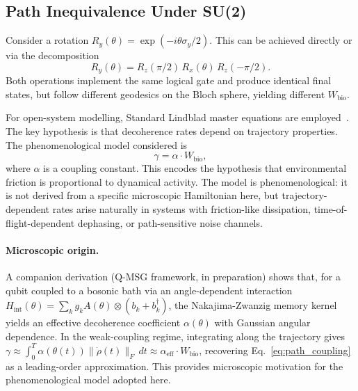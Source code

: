 \documentclass[12pt,a4paper]{article}
\begin{document}
\subsection{Path Inequivalence Under SU(2)}

Consider a rotation $R_y(\theta) = \exp(-i\theta\sigma_y/2)$. This can be
achieved directly or via the decomposition~\citep{nielsen2010quantum}
\begin{equation}
  R_y(\theta) = R_z(\pi/2)\,R_x(\theta)\,R_z(-\pi/2).
  \label{eq:decomposition}
\end{equation}
Both operations implement the same logical gate and produce identical final
states, but follow different geodesics on the Bloch sphere, yielding
different $W_{\mathrm{bio}}$.

For open-system modelling, Standard Lindblad master equations are employed~\citep{breuer2002open}. The key hypothesis is that decoherence
rates depend on trajectory properties. The phenomenological model considered is
\begin{equation}
  \gamma = \alpha \cdot W_{\mathrm{bio}},
  \label{eq:path_coupling}
\end{equation}
where $\alpha$ is a coupling constant. This encodes the hypothesis that
environmental friction is proportional to dynamical activity. The model is
phenomenological: it is not derived from a specific microscopic Hamiltonian
here, but trajectory-dependent rates arise naturally in systems with
friction-like dissipation, time-of-flight-dependent dephasing, or
path-sensitive noise channels.

\paragraph{Microscopic origin.}
A companion derivation (Q-MSG framework, in preparation) shows that,
for a qubit coupled to a bosonic bath via an angle-dependent interaction
$H_{\mathrm{int}}(\theta) = \sum_k g_k A(\theta)\otimes(b_k+b_k^\dagger)$,
the Nakajima-Zwanzig memory kernel yields an effective decoherence
coefficient $\alpha(\theta)$ with Gaussian angular dependence. In the
weak-coupling regime, integrating along the trajectory gives
$\gamma \approx \int_0^T \alpha(\theta(t))\|\dot{\rho}(t)\|_F\,dt
\approx \alpha_{\mathrm{eff}}\cdot W_{\mathrm{bio}}$,
recovering Eq.~\eqref{eq:path_coupling} as a leading-order approximation.
This provides microscopic motivation for the phenomenological model
adopted here.

\end{document}
